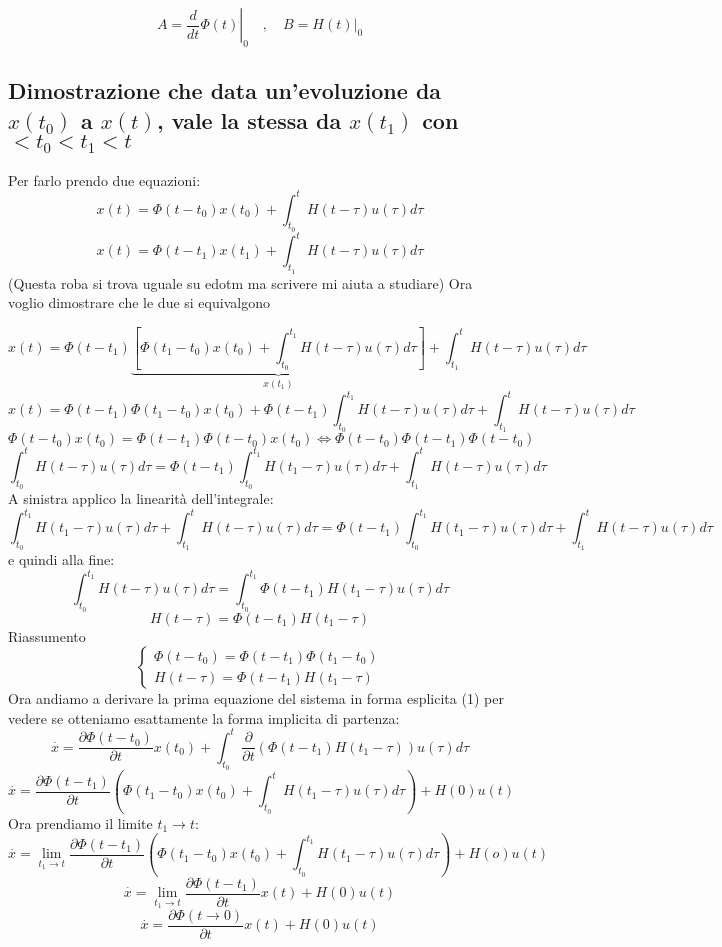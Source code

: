 \documentclass{article}
\begin{document}
\[ A = \left.\frac{d}{dt}\Phi(t)\right|_{0} \quad,\quad B = \left.H(t)\right|_{0} \]


\subsection{\boldmath Dimostrazione che data un'evoluzione da $x(t_0)$ a $x(t)$, vale la stessa da $x(t_1)$ con $<t_0<t_1<t$}
Per farlo prendo due equazioni:
\begin{equation}
    x(t) = \Phi(t-t_0)x(t_0)+\int_{t_0}^{t} H(t-\tau)u(\tau)d\tau
\end{equation}
\begin{equation}
    x(t) = \Phi(t-t_1)x(t_1)+\int_{t_1}^{t} H(t-\tau)u(\tau)d\tau
\end{equation}
(Questa roba si trova uguale su edotm ma scrivere mi aiuta a studiare)
Ora voglio dimostrare che le due si equivalgono

\[ x(t) = \Phi(t-t_1)\underbrace{\left[ \Phi(t_1-t_0)x(t_0)+\int_{t_0}^{t_1} H(t-\tau)u(\tau)d\tau\right]}_{x(t_1)}+\int_{t_1}^{t} H(t-\tau)u(\tau)d\tau \]
\[x(t) = \Phi(t-t_1)\Phi(t_1-t_0)x(t_0)+\Phi(t-t_1)\int_{t_0}^{t_1} H(t-\tau)u(\tau)d\tau+\int_{t_1}^{t} H(t-\tau)u(\tau)d\tau\]
\[ \Phi(t-t_0)x(t_0)= \Phi(t-t_1)\Phi(t-t_0)x(t_0)\Longleftrightarrow\Phi(t-t_0)\Phi(t-t_1)\Phi(t-t_0) \]
\[ \int_{t_0}^{t} H(t-\tau)u(\tau)d\tau = \Phi(t-t_1)\int_{t_0}^{t_1} H(t_1-\tau)u(\tau)d\tau+\int_{t_1}^{t} H(t-\tau)u(\tau)d\tau \] 
A sinistra applico la linearità dell'integrale:
\[ \int_{t_0}^{t_1} H(t_1-\tau)u(\tau)d\tau+\int_{t_1}^{t} H(t-\tau)u(\tau)d\tau
 = \Phi(t-t_1)\int_{t_0}^{t_1} H(t_1-\tau)u(\tau)d\tau+\int_{t_1}^{t} H(t-\tau)u(\tau)d\tau \]
e quindi alla fine:
\[ \int_{t_0}^{t_1} H(t-\tau)u(\tau)d\tau = \int_{t_0}^{t_1}\Phi(t-t_1) H(t_1-\tau)u(\tau)d\tau \]
\[ H(t-\tau) = \Phi(t-t_1) H(t_1-\tau) \]
Riassumento
\[\begin{cases} 
        \Phi(t-t_0) = \Phi(t-t_1)\Phi(t_1-t_0)\\
        H(t-\tau) = \Phi(t-t_1) H(t_1-\tau)
\end{cases}
\]
Ora andiamo a derivare la prima equazione del sistema in forma esplicita (1) per vedere se otteniamo
esattamente la forma implicita di partenza:
\[ \overset{\cdot}{x} = \frac{\partial \Phi(t-t_0)}{\partial t}x(t_0)+\int_{t_0}^{t} \frac{\partial}{\partial t}\left( \Phi(t-t_1) H(t_1-\tau)\right)u(\tau)d\tau \]
\[ \overset{\cdot}{x} = \frac{\partial \Phi(t-t_1)}{\partial t}\left(\Phi(t_1-t_0)x(t_0)+\int_{t_0}^{t}H(t_1-\tau)u(\tau)d\tau\right)+H(0)u(t) \]
Ora prendiamo il limite $t_1\to t$:
\[ \overset{\cdot}{x} = \lim_{t_1\to t}\frac{\partial \Phi(t-t_1)}{\partial t}\left(\Phi(t_1-t_0)x(t_0)+\int_{t_0}^{t_1}H(t_1-\tau)u(\tau)d\tau\right)+H(o)u(t) \]
\[ \overset{\cdot}{x} = \lim_{t_1\to t}\frac{\partial \Phi(t-t_1)}{\partial t}x(t)+H(0)u(t) \]
\[ \overset{\cdot}{x} = \frac{\partial \Phi(t\to0)}{\partial t}x(t)+H(0)u(t) \]
\end{document}
